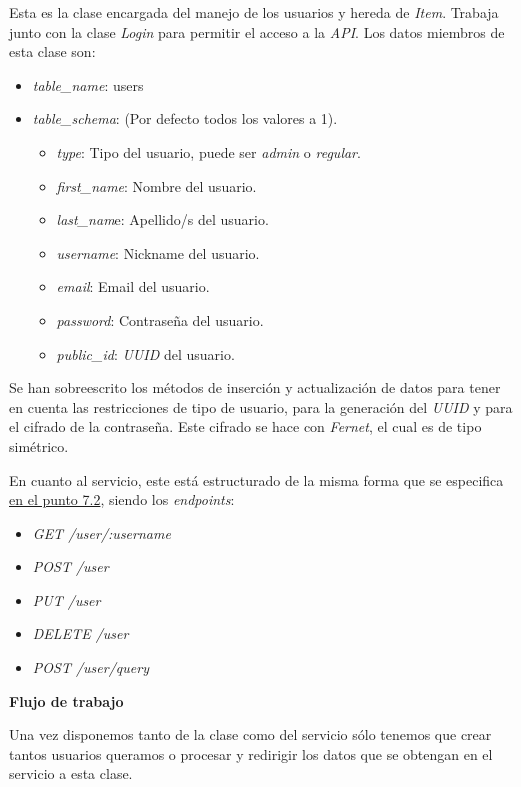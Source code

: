 Esta es la clase encargada del manejo de los usuarios y hereda de \textit{Item}. Trabaja junto con la clase \textit{Login} para permitir el acceso a la \textit{API}. Los datos miembros de esta clase son:
\begin{itemize}
	\item \textit{table\_name}: users
	\item \textit{table\_schema}: (Por defecto todos los valores a 1).
	\begin{itemize}
		\item \textit{type}: Tipo del usuario, puede ser \textit{admin} o \textit{regular}.
		\item \textit{first\_name}: Nombre del usuario.
		\item \textit{last\_nam}e: Apellido/s del usuario.
		\item \textit{username}: Nickname del usuario.
		\item \textit{email}: Email del usuario.
		\item \textit{password}: Contraseña del usuario.
		\item \textit{public\_id}: \textit{UUID} del usuario.
	\end{itemize}
\end{itemize}


\bigskip
Se han sobreescrito los métodos de inserción y actualización de datos para tener en cuenta las restricciones de tipo de usuario, para la generación del \textit{UUID} y para el cifrado de la contraseña. Este cifrado se hace con \textit{Fernet}, el cual es de tipo simétrico.

En cuanto al servicio, este está estructurado de la misma forma que se especifica \hyperref[sec:servicios]{en el punto 7.2}, siendo los \textit{endpoints}:
\begin{itemize}
	\item \textit{GET /user/:username}
	\item \textit{POST /user}
	\item \textit{PUT /user}
	\item \textit{DELETE /user}
	\item \textit{POST /user/query}
\end{itemize}

\bigskip
\textbf{Flujo de trabajo}

Una vez disponemos tanto de la clase como del servicio sólo tenemos que crear tantos usuarios queramos o procesar y redirigir los datos que se obtengan en el servicio a esta clase.




